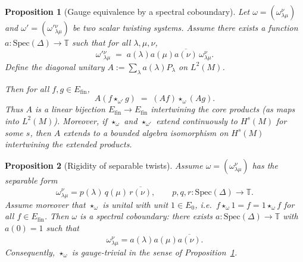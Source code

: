 \documentclass[10pt,a4paper]{amsart}
\newtheorem{proposition}{Proposition}
\newcommand{\Spec}{\mathrm{Spec}}
\newcommand{\bbT}{\mathbb{T}}
\begin{document}
\begin{proposition}[Gauge equivalence by a spectral coboundary]\label{prop:gauge_equivalence}
Let $\omega=(\omega^\nu_{\lambda\mu})$ and $\omega'=(\omega'{}^\nu_{\lambda\mu})$ be two scalar twisting systems.
Assume there exists a function $a:\Spec(\Delta)\to\bbT$ such that for all $\lambda,\mu,\nu$,
\begin{equation}\label{eq:coboundary_relation}
\omega'{}^\nu_{\lambda\mu} \;=\; a(\lambda)a(\mu)\overline{a(\nu)}\,\omega^\nu_{\lambda\mu}.
\end{equation}
Define the diagonal unitary $A:=\sum_\lambda a(\lambda)P_\lambda$ on $L^2(M)$.

Then for all $f,g\in E_{\mathrm{fin}}$,
\[
A(f\star_{\omega'} g) \;=\; (Af)\star_\omega (Ag).
\]
Thus $A$ is a linear bijection $E_{\mathrm{fin}}\to E_{\mathrm{fin}}$ intertwining the core products (as maps into $L^2(M)$).
Moreover, if $\star_\omega$ and $\star_{\omega'}$ extend continuously to $H^s(M)$ for some $s$,
then $A$ extends to a bounded algebra isomorphism on $H^s(M)$ intertwining the extended products.
\end{proposition}

\begin{proposition}[Rigidity of separable twists]\label{prop:separable_twists_are_coboundaries}
Assume $\omega=(\omega^\nu_{\lambda\mu})$ has the separable form
\[
\omega^\nu_{\lambda\mu}=p(\lambda)\,q(\mu)\,\overline{r(\nu)},
\qquad p,q,r:\Spec(\Delta)\to\bbT.
\]
Assume moreover that $\star_\omega$ is unital with unit $1\in E_0$, i.e.\ $f\star_\omega 1=f=1\star_\omega f$ for all $f\in E_{\mathrm{fin}}$.
Then $\omega$ is a spectral coboundary: there exists $a:\Spec(\Delta)\to\bbT$ with $a(0)=1$ such that
\[
\omega^\nu_{\lambda\mu}=a(\lambda)a(\mu)\overline{a(\nu)}.
\]
Consequently, $\star_\omega$ is gauge-trivial in the sense of Proposition~\ref{prop:gauge_equivalence}.
\end{proposition}
\end{document}
